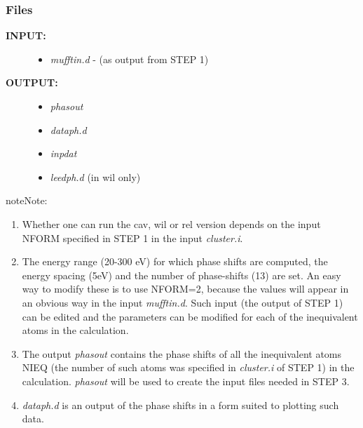 \documentclass[letterpaper,10pt,english]{sphinxmanual}
\begin{document}
\subsubsection{Files}
\label{phshift2007:id4}\begin{description}
\item[{\textbf{INPUT:}}] \leavevmode\begin{itemize}
\item {} 
\emph{mufftin.d} - (as output from STEP 1)

\end{itemize}

\item[{\textbf{OUTPUT:}}] \leavevmode\begin{itemize}
\item {} 
\emph{phasout}

\item {} 
\emph{dataph.d}

\item {} 
\emph{inpdat}

\item {} 
\emph{leedph.d} (in wil only)

\end{itemize}

\end{description}

\begin{notice}{note}{Note:}\begin{enumerate}
\item {} 
Whether one can run the cav, wil or rel version
depends on the input NFORM specified in STEP 1 in
the input \emph{cluster.i}.

\item {} 
The energy range (20-300 eV) for which phase shifts are
computed, the energy spacing (5eV) and the number of
phase-shifts (13) are set. An easy way to modify these is
to use NFORM=2, because the values will appear in an
obvious way in the input \emph{mufftin.d}. Such input (the
output of STEP 1) can be edited and the parameters can
be modified for each of the inequivalent atoms in the
calculation.

\item {} 
The output \emph{phasout} contains the phase shifts of all the
inequivalent atoms NIEQ (the number of such atoms was
specified in \emph{cluster.i} of STEP 1) in the calculation.
\emph{phasout} will be  used to create the input files needed in
STEP 3.

\item {} 
\emph{dataph.d} is an output of the phase shifts in a form
suited to plotting such data.

\end{enumerate}
\end{notice}
\end{document}
